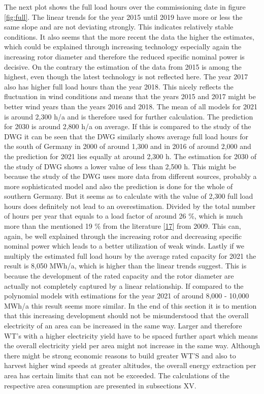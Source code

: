 \documentclass[a4paper,11pt]{article}
\begin{document}
The next plot shows the full load hours over the commissioning date in figure \ref{fig:full}. The linear trends for the year 2015 until 2019 have more or less the same slope and are not deviating strongly. This indicates relatively stable conditions. It also seems that the more recent the data the higher the estimates, which could be explained through increasing technology especially again the increasing rotor diameter and therefore the reduced specific nominal power is decisive. On the contrary the estimation of the data from 2015 is among the highest, even though the latest technology is not reflected here. The year 2017 also has higher full load hours than the year 2018. This nicely reflects the fluctuation in wind conditions and means that the years 2015 and 2017 might be better wind years than the years 2016 and 2018. The mean of all models for 2021 is around 2,300 h/a and is therefore used for further calculation. The prediction for 2030 is around 2,800 h/a on average. If this is compared to the study of the DWG it can be seen that the DWG similarly shows average full load hours for the south of Germany in 2000 of around 1,300 and in 2016 of around 2,000 and the prediction for 2021 lies equally at around 2,300 h. The estimation for 2030 of the study of DWG shows a lower value of less than 2,500 h. This might be because the study of the DWG uses more data from different sources, probably a more sophisticated model and also the prediction is done for the whole of southern Germany. But it seems as to calculate with the value of 2,300 full load hours does definitely not lead to an overestimation. Divided by the total number of hours per year that equals to a load factor of around 26 \%, which is much more than the mentioned 19 \% from the literature {[}\protect\hyperlink{ref-DavidJCMacKay.2009}{17}{]} from 2009. This can, again, be well explained through the increasing rotor and decreasing specific nominal power which leads to a better utilization of weak winds. Lastly if we multiply the estimated full load hours by the average rated capacity for 2021 the result is 8,050 MWh/a, which is higher than the linear trends suggest. This is because the development of the rated capacity and the rotor diameter are actually not completely captured by a linear relationship. If compared to the polynomial models with estimations for the year 2021 of around 8,000 - 10,000 MWh/a this result seems more similar. In the end of this section it is to mention that this increasing development should not be misunderstood that the overall electricity of an area can be increased in the same way. Larger and therefore WT's with a higher electricity yield have to be spaced further apart which means the overall electricity yield per area might not increase in the same way. Although there might be strong economic reasons to build greater WT'S and also to harvest higher wind speeds at greater altitudes, the overall energy extraction per area has certain limits that can not be exceeded. The calculations of the respective area consumption are presented in subsections XV.
\end{document}

